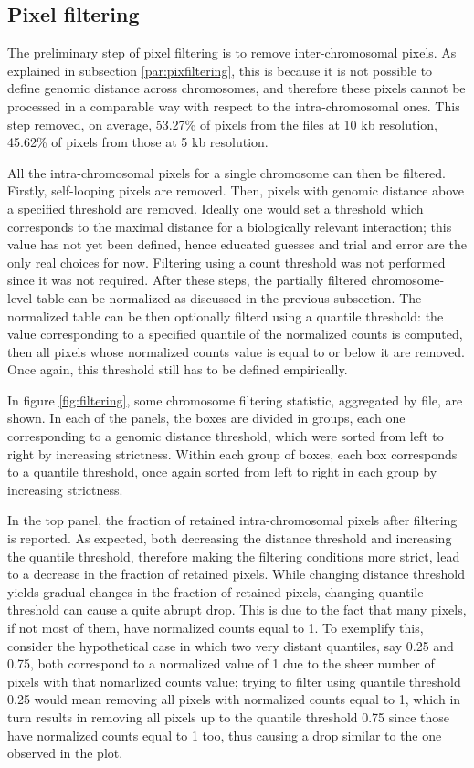 \subsection{Pixel filtering}

The preliminary step of pixel filtering is to remove inter-chromosomal pixels. As explained in subsection \ref{par:pixfiltering}, this is because it is not possible to define genomic distance across chromosomes, and therefore these pixels cannot be processed in a comparable way with respect to the intra-chromosomal ones. This step removed, on average, 53.27\% of pixels from the files at 10 kb resolution, 45.62\% of pixels from those at 5 kb resolution.

All the intra-chromosomal pixels for a single chromosome can then be filtered. Firstly, self-looping pixels are removed. Then, pixels with genomic distance above a specified threshold are removed. Ideally one would set a threshold which corresponds to the maximal distance for a biologically relevant interaction; this value has not yet been defined, hence educated guesses and trial and error are the only real choices for now. Filtering using a count threshold was not performed since it was not required. After these steps, the partially filtered chromosome-level table can be normalized as discussed in the previous subsection. The normalized table can be then optionally filterd using a quantile threshold: the value corresponding to a specified quantile of the normalized counts is computed, then all pixels whose normalized counts value is equal to or below it are removed. Once again, this threshold still has to be defined empirically. 

In figure \ref{fig:filtering}, some chromosome filtering statistic, aggregated by file, are shown. In each of the panels, the boxes are divided in groups, each one corresponding to a genomic distance threshold, which were sorted from left to right by increasing strictness. Within each group of boxes, each box corresponds to a quantile threshold, once again sorted from left to right in each group by increasing strictness.

In the top panel, the fraction of retained intra-chromosomal pixels after filtering is reported. As expected, both decreasing the distance threshold and increasing the quantile threshold, therefore making the filtering conditions more strict, lead to a decrease in the fraction of retained pixels. While changing distance threshold yields gradual changes in the fraction of retained pixels, changing quantile threshold can cause a quite abrupt drop. This is due to the fact that many pixels, if not most of them, have normalized counts equal to 1. To exemplify this, consider the hypothetical case in which two very distant quantiles, say 0.25 and 0.75, both correspond to a normalized value of 1 due to the sheer number of pixels with that nomarlized counts value; trying to filter using quantile threshold 0.25 would mean removing all pixels with normalized counts equal to 1, which in turn results in removing all pixels up to the quantile threshold 0.75 since those have normalized counts equal to 1 too, thus causing a drop similar to the one observed in the plot.

